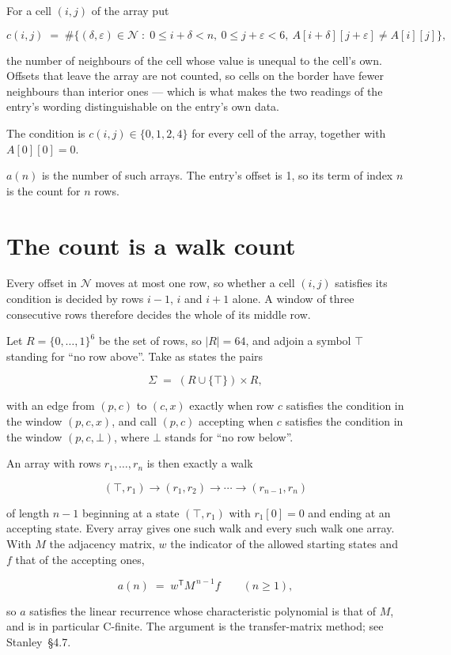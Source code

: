 \documentclass[11pt]{article}
\theoremstyle{definition}
\begin{document}
For a cell $(i,j)$ of the array put

\[c(i,j) \;=\; \#\bigl\{(\delta,\varepsilon)\in\mathcal{N} \;:\; 0\le i+\delta<n,\ 0\le j+\varepsilon<6,\ A[i+\delta][j+\varepsilon] \neq A[i][j]\bigr\},\]

the number of neighbours of the cell whose value is unequal to the cell's own. Offsets that leave the array are not counted, so cells on the border have fewer neighbours than interior ones --- which is what makes the two readings of the entry's wording distinguishable on the entry's own data.

The condition is $c(i,j) \in \{0, 1, 2, 4\}$ for every cell of the array, together with $A[0][0]=0$.

$a(n)$ is the number of such arrays. The entry's offset is 1, so its term of index $n$ is the count for $n$ rows.

\section{The count is a walk count}

Every offset in $\mathcal{N}$ moves at most one row, so whether a cell $(i,j)$ satisfies its condition is decided by rows $i-1$, $i$ and $i+1$ alone. A window of three consecutive rows therefore decides the whole of its middle row.

Let $R = \{0,\dots,1\}^{6}$ be the set of rows, so $|R| = 64$, and adjoin a symbol $\top$ standing for ``no row above''. Take as states the pairs

\[\Sigma \;=\; (R \cup \{\top\}) \times R,\]

with an edge from $(p,c)$ to $(c,x)$ exactly when row $c$ satisfies the condition in the window $(p,c,x)$, and call $(p,c)$ accepting when $c$ satisfies the condition in the window $(p,c,\bot)$, where $\bot$ stands for ``no row below''.

An array with rows $r_1,\dots,r_n$ is then exactly a walk

\[(\top,r_1) \to (r_1,r_2) \to \cdots \to (r_{n-1},r_n)\]

of length $n-1$ beginning at a state $(\top,r_1)$ with $r_1[0]=0$ and ending at an accepting state. Every array gives one such walk and every such walk one array. With $M$ the adjacency matrix, $w$ the indicator of the allowed starting states and $f$ that of the accepting ones,

\[a(n) \;=\; w^{\mathsf T} M^{\,n-1} f \qquad (n \ge 1),\]

so $a$ satisfies the linear recurrence whose characteristic polynomial is that of $M$, and is in particular C-finite. The argument is the transfer-matrix method; see Stanley~\S4.7.
\end{document}
